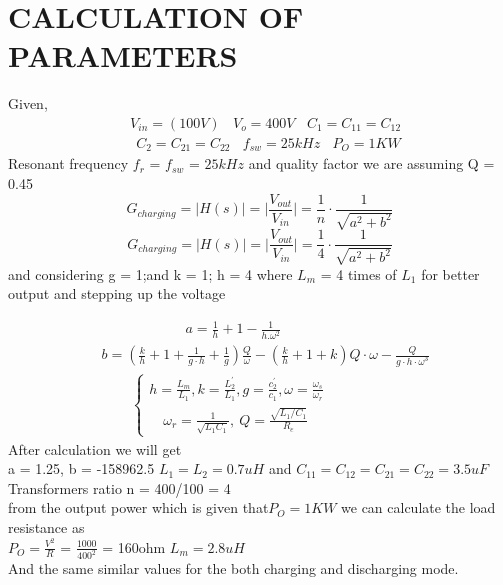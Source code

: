 \documentclass{book}
\begin{document}
   \chapter{CALCULATION OF PARAMETERS}
	 Given,
      \begin{equation*}\begin{split} &V_{in}=(100V) \ \ \ \ V_{o}^{}=400V\ \ \ \ C_{1}=C_{11}=C_{12}\\ &\ \ C_{2}=C_{21}=C_{22}\ \ \ \ f_{sw}=25kHz \ \ \ \ P_{O}=1KW \end{split} \end{equation*}
       Resonant frequency \( f_{r}  \) = \( f_{sw}  \) = \( 25kHz  \) and quality factor we are assuming Q = 0.45
       \begin{equation*} G_{charging}=\vert H(s)\vert =\vert \frac{V_{out}}{V_{in}}\vert =\frac{1}{n}\cdot\frac{1}{\sqrt{a^{2}+b^{2}}}  \end{equation*}
         \begin{equation*} G_{charging}=\vert H(s)\vert =\vert \frac{V_{out}}{V_{in}}\vert =\frac{1}{4}\cdot\frac{1}{\sqrt{a^{2}+b^{2}}}  \end{equation*}
         and considering g = 1;and k = 1; h = 4 where \(L_{m}\) = 4 times of \(L_{1}\) for better output and stepping up the voltage
         
          
          \begin{align*} &\qquad\qquad\qquad a= \frac{1}{h}+1-\frac{1}{h.\omega^{2}} \\ &b=\left(\frac{k}{h}+1+\frac{1}{g\cdot h}+\frac{1}{g}\right)\frac{Q}{\omega}-(\frac{k}{h}+1+k) Q\cdot\omega-\frac{Q}{g\cdot h\cdot\omega^{3}} \\ &\quad\ \ \ \ \ \begin{cases} h=\frac{L_{m}}{L_{1}}, k=\frac{L_{2}^{\prime}}{L_{1}}, g=\frac{c_{2}^{\prime}}{c_{1}}, \omega=\frac{\omega_{s}}{\omega_{r}}\\ \quad\omega_{r}=\frac{1}{\sqrt{L_{1}C_{1}}}, \ Q=\frac{\sqrt{L_{1}/C_{1}}}{R_{e}} \end{cases} \end{align*}
        After calculation we will get 
          \\ a = 1.25, b = -158962.5 \( L_{1}= L_{2} = 0.7uH  \) and \( C_{11}= C_{12}=C_{21} =C_{22} = 3.5uF \)
          \\
          Transformers ratio n = 400/100 = 4 \\ 
          from the output power which is given that\(P_{O} = 1KW\) we can calculate the load resistance as \\
          \( P_{O} = \frac{V^2}{R} \) = \(  \frac{1000}{400^2} \) = 160ohm   \(L_{m}=2.8uH\)
          \\
          And the same similar values for the both charging and discharging mode.
\end{document}
